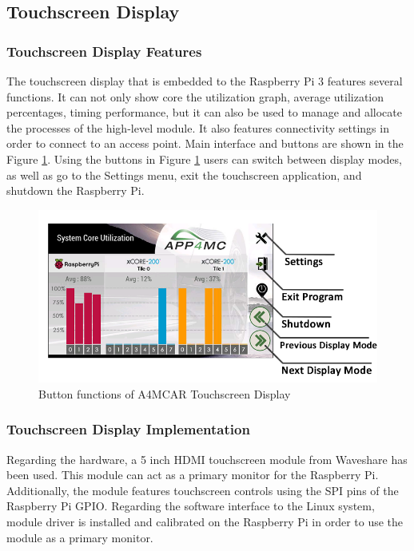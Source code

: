 \subsection{Touchscreen Display}
\subsubsection{Touchscreen Display Features}
The touchscreen display that is embedded to the Raspberry Pi 3 features several functions. It can not only show core the utilization graph, average utilization percentages, timing performance, but it can also be used to manage and allocate the processes of the high-level module. It also features connectivity settings in order to connect to an access point. Main interface and buttons are shown in the Figure \ref{fig:displaybuttons}. Using the buttons in Figure \ref{fig:displaybuttons} users can switch between display modes, as well as go to the Settings menu, exit the touchscreen application, and shutdown the Raspberry Pi. 
\begin{figure}[!ht]
	\centering
	\captionsetup{justification=centering}
	\includegraphics[scale=0.5]{content/images/displaybuttons.png}
	\caption{Button functions of A4MCAR Touchscreen Display}
	\label{fig:displaybuttons}
\end{figure}

\subsubsection{Touchscreen Display Implementation}
Regarding the hardware, a 5 inch HDMI touchscreen module from Waveshare has been used. This module can act as a primary monitor for the Raspberry Pi. Additionally, the module features touchscreen controls using the SPI pins of the Raspberry Pi GPIO. Regarding the software interface to the Linux system, module driver is installed and calibrated on the Raspberry Pi in order to use the module as a primary monitor. 

